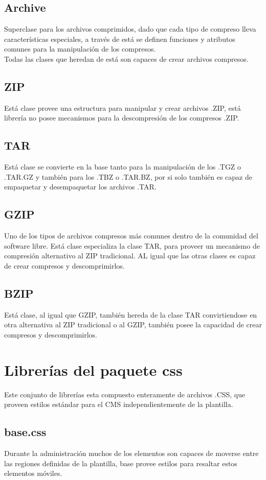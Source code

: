 \subsection{Archive}
Superclase para los archivos comprimidos, dado que cada tipo de compreso lleva caracter\'isticas especiales, a trav\'es de est\'a se definen funciones y atributos comunes para la manipulaci\'on de los compresos.\\Todas las clases que heredan de est\'a son capaces de crear archivos compresos.
\subsection{ZIP}
Est\'a clase provee una estructura para manipular y crear archivos .ZIP, est\'a librer\'ia no posee mecanismos para la descompresi\'on de los compresos .ZIP.
\subsection{TAR}
Est\'a clase se convierte en la base tanto para la manipulaci\'on de los .TGZ o .TAR.GZ y tambi\'en para los .TBZ o .TAR.BZ, por si solo tambi\'en es capaz de empaquetar y desempaquetar los archivos .TAR.
\subsection{GZIP}
Uno de los tipos de archivos compresos m\'as comunes dentro de la comunidad del software libre. Est\'a clase especializa la clase TAR, para proveer un mecanismo de compresi\'on alternativo al ZIP tradicional. AL igual que las otras clases es capaz de crear compresos y descomprimirlos.
\subsection{BZIP}
Est\'a clase, al igual que GZIP, tambi\'en hereda de la clase TAR convirtiendose en otra alternativa al ZIP tradicional o al GZIP, tambi\'en posee la capacidad de crear compresos y descomprimirlos.

\section{Librer\'ias del paquete \textsf{css}}
Este conjunto de librer\'ias esta compuesto enteramente de archivos .CSS, que proveen estilos est\'andar para el CMS independientemente de la plantilla.
\subsection{base.css}
Durante la administraci\'on muchos de los elementos son capaces de moverse entre las regiones definidas de la plantilla, \textsf{base} provee estilos para resaltar estos elementos m\'oviles.
